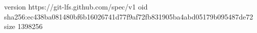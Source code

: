 version https://git-lfs.github.com/spec/v1
oid sha256:ec438ba081480bf6b16026741d77f9af72fb831905ba4abd05179b095487de72
size 1398256

